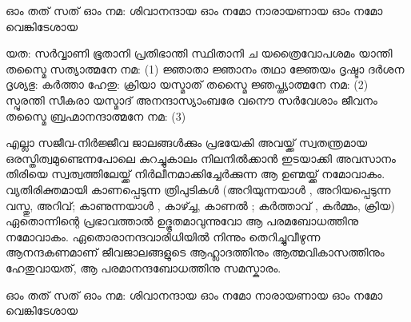 \newpage
{}

ഓം തത്‌ സത്‌
ഓം നമ: ശിവാനന്ദായ
ഓം നമോ നാരായണായ
ഓം നമോ വെങ്കിടേശായ

യത: സര്‍വ്വാണി ഭൂതാനി പ്രതിഭാന്തി സ്ഥിതാനി ച
യത്രൈവോപശമം യാന്തി തസ്മൈ സത്യാത്മനേ നമ: (1)
ജ്ഞാതാ ജ്ഞാനം തഥാ ജ്ഞേയം ദൃഷ്ടാ ദര്‍ശന ദൃശ്യഭു:
കര്‍ത്താ ഹേതു: ക്രിയാ യസ്മാത്‌ തസ്മൈ ജ്ഞപ്ത്യാത്മനേ നമ: (2)
സ്പുരന്തി സീകരാ യസ്മാദ്‌ അനന്ദാസ്യാംബരേ വനൌ
സര്‍വേശാം ജീവനം തസ്മൈ ബ്രഹ്മാനന്ദാത്മനേ നമ: (3)

എല്ലാ സജീവ-നിര്‍ജ്ജീവ ജാലങ്ങള്‍ക്കും പ്രഭയേകി അവയ്ക്ക്‌ സ്വതന്ത്രമായ ഒരസ്തിത്വമുണ്ടെന്നപോലെ  കുറച്ചുകാലം നിലനില്‍ക്കാന്‍ ഇടയാക്കി അവസാനം തിരിയെ സ്വത്വത്തിലേയ്ക്ക്‌ നിര്‍ലീനമാക്കിച്ചേര്‍ക്കുന്ന ആ ഉണ്മയ്ക്ക്‌ നമോവാകം. വ്യതിരിക്തമായി കാണപ്പെടുന്ന ത്രിപുടികള്‍ (അറിയുന്നയാള്‍ , അറിയപ്പെടുന്ന വസ്തു, അറിവ്‌; കാണുന്നയാള്‍ , കാഴ്ച്ച, കാണല്‍ ; കര്‍ത്താവ്‌ , കര്‍മ്മം, ക്രിയ) ഏതൊന്നിന്റെ പ്രഭാവത്താല്‍ ഉദ്ഭൂതമാവുന്നുവോ ആ പരമബോധത്തിനു നമോവാകം. ഏതൊരാനന്ദവാരിധിയില്‍ നിന്നും തെറിച്ചുവീഴുന്ന ആനന്ദകണമാണ്‌ ജീവജാലങ്ങളുടെ ആഹ്ലാദത്തിനും ആത്മവികാസത്തിനും ഹേതുവായത്‌, ആ പരമാനന്ദബോധത്തിനു സമസ്കാരം.

ഓം തത്‌ സത്‌
ഓം നമ: ശിവാനന്ദായ
ഓം നമോ നാരായണായ
ഓം നമോ വെങ്കിടേശായ
